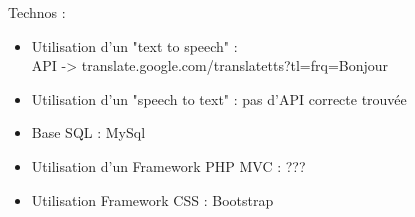 \documentclass[12pt,a4paper]{report}
\begin{document}
Technos :
\begin{itemize}
\item Utilisation d'un "text to speech" :\\API -> translate.google.com/translatetts?tl=frq=Bonjour
\item Utilisation d'un "speech to text" : pas d'API correcte trouvée
\item Base SQL : MySql
\item Utilisation d'un Framework PHP MVC : ???
\item Utilisation Framework CSS : Bootstrap
\end{itemize}





\end{document}
